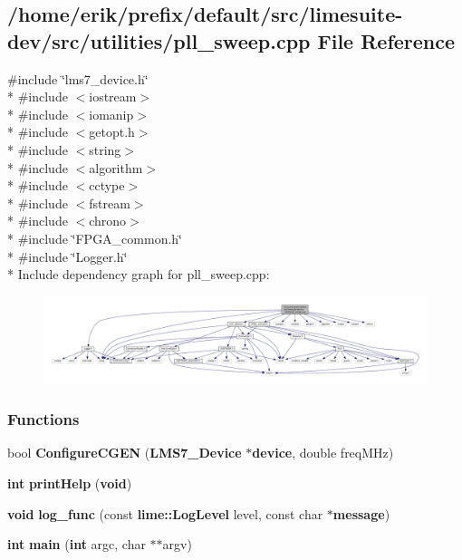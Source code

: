 \subsection{/home/erik/prefix/default/src/limesuite-\/dev/src/utilities/pll\+\_\+sweep.cpp File Reference}
\label{pll__sweep_8cpp}
{\ttfamily \#include \char`\"{}lms7\+\_\+device.\+h\char`\"{}}\\*
{\ttfamily \#include $<$iostream$>$}\\*
{\ttfamily \#include $<$iomanip$>$}\\*
{\ttfamily \#include $<$getopt.\+h$>$}\\*
{\ttfamily \#include $<$string$>$}\\*
{\ttfamily \#include $<$algorithm$>$}\\*
{\ttfamily \#include $<$cctype$>$}\\*
{\ttfamily \#include $<$fstream$>$}\\*
{\ttfamily \#include $<$chrono$>$}\\*
{\ttfamily \#include \char`\"{}F\+P\+G\+A\+\_\+common.\+h\char`\"{}}\\*
{\ttfamily \#include \char`\"{}Logger.\+h\char`\"{}}\\*
Include dependency graph for pll\+\_\+sweep.\+cpp\+:
\nopagebreak
\begin{figure}[H]
\begin{center}
\leavevmode
\includegraphics[width=350pt]{d5/d7e/pll__sweep_8cpp__incl}
\end{center}
\end{figure}
\subsubsection*{Functions}
\begin{DoxyCompactItemize}
\item 
bool {\bf Configure\+C\+G\+EN} ({\bf L\+M\+S7\+\_\+\+Device} $\ast${\bf device}, double freq\+M\+Hz)
\item 
{\bf int} {\bf print\+Help} ({\bf void})
\item 
{\bf void} {\bf log\+\_\+func} (const {\bf lime\+::\+Log\+Level} level, const char $\ast${\bf message})
\item 
{\bf int} {\bf main} ({\bf int} argc, char $\ast$$\ast$argv)
\end{DoxyCompactItemize}
